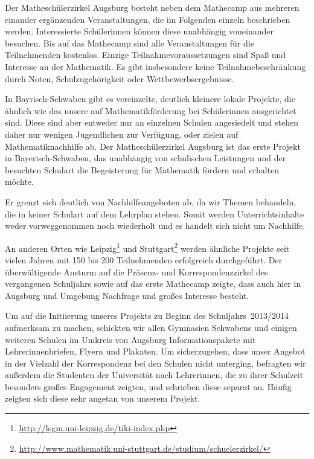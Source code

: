 \documentclass[12pt]{zettel}
\begin{document}
Der Matheschülerzirkel Augsburg besteht neben dem Mathecamp aus mehreren einander ergänzenden Veranstaltungen, die im
Folgenden einzeln beschrieben werden. Interessierte Schülerinnen
können diese unabhängig voneinander besuchen. Bis auf das Mathecamp sind alle
Veranstaltungen für die Teilnehmenden kostenlos. Einzige
Teilnahmevoraussetzungen sind Spaß und Interesse an der Mathematik. Es gibt
insbesondere keine Teilnahmebeschränkung durch Noten, Schulzugehörigkeit oder
Wettbewerbsergebnisse.

In Bayrisch-Schwaben gibt es vereinzelte, deutlich kleinere lokale
Projekte, die ähnlich wie das unsere auf Mathematikförderung bei Schülerinnen ausgerichtet sind. Diese sind aber entweder nur an einzelnen Schulen
angesiedelt und stehen daher nur wenigen Jugendlichen zur Verfügung, oder zielen
auf Mathematiknachhilfe ab. Der Matheschülerzirkel Augsburg ist das erste
Projekt in Bayerisch-Schwaben, das unabhängig von schulischen Leistungen und der besuchten Schulart die
Begeisterung für Mathematik fördern und erhalten möchte.

Er grenzt sich deutlich von Nachhilfeangeboten ab, da wir Themen behandeln, die in keiner Schulart auf dem Lehrplan stehen. Somit werden Unterrichtsinhalte weder
vorweggenommen noch wiederholt und es handelt sich nicht um Nachhilfe.

An anderen Orten wie Leipzig\footnote{\href{http://lsgm.uni-leipzig.de/tiki-index.php}{\textsf{http:/\!/lsgm.uni-leipzig.de/tiki-index.php}}} und
Stuttgart\footnote{\href{http://www.mathematik.uni-stuttgart.de/studium/schuelerzirkel/}{\textsf{http:/\!/www.mathematik.uni-stuttgart.de/studium/schuelerzirkel/}}}
werden ähnliche Projekte seit
vielen Jahren mit 150 bis 200 Teilnehmenden erfolgreich durchgeführt. Der überwältigende Ansturm auf die Präsenz- und Korrespondenzzirkel des vergangenen Schuljahrs sowie auf das
erste Mathecamp zeigte, dass auch hier in Augsburg und Umgebung Nachfrage und großes Interesse besteht.

Um auf die Initiierung unseres Projekts zu Beginn des Schuljahrs~2013/2014
aufmerksam zu machen, schickten wir allen Gymnasien Schwabens und einigen
weiteren Schulen im Umkreis von Augsburg Informationspakete mit Lehrerinnenbriefen,
Flyern und Plakaten. Um sicherzugehen, dass unser Angebot in der
Vielzahl der Korrespondenz bei den Schulen nicht unterging, befragten wir außerdem
die Studenten der Universität nach Lehrerinnen, die zu ihrer Schulzeit
besonders großes Engagement zeigten, und schrieben diese separat an.
Häufig zeigten sich diese sehr angetan von unserem Projekt.
\end{document}
